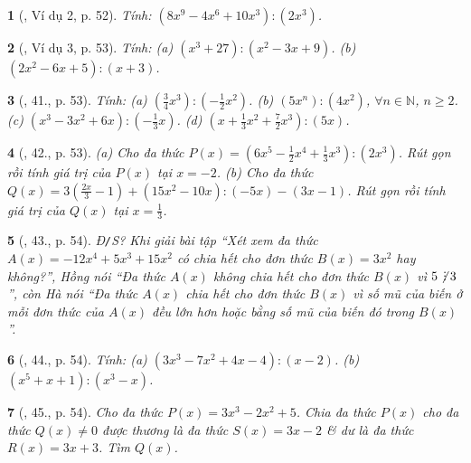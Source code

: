 \documentclass{article}
\newtheorem{baitoan}{}
\DeclareRobustCommand{\divby}{%
	\mathrel{\vbox{\baselineskip.65ex\lineskiplimit0pt\hbox{.}\hbox{.}\hbox{.}}}%
}
\begin{document}
\begin{baitoan}[\cite{SBT_Toan_7_Canh_Dieu_tap_2}, Ví dụ 2, p. 52]
	Tính: $(8x^9 - 4x^6 + 10x^3):(2x^3)$.
\end{baitoan}

\begin{baitoan}[\cite{SBT_Toan_7_Canh_Dieu_tap_2}, Ví dụ 3, p. 53]
	Tính: (a) $(x^3 + 27):(x^2 - 3x + 9)$. (b) $(2x^2 - 6x + 5):(x + 3)$.
\end{baitoan}

\begin{baitoan}[\cite{SBT_Toan_7_Canh_Dieu_tap_2}, 41., p. 53]
	Tính: (a) $\left(\frac{3}{4}x^3\right):\left(-\frac{1}{2}x^2\right)$. (b) $(5x^n):(4x^2)$, $\forall n\in\mathbb{N}$, $n\ge2$. (c) $(x^3 - 3x^2 + 6x):\left(-\frac{1}{3}x\right)$. (d) $\left(x + \frac{1}{3}x^2 + \frac{7}{2}x^3\right):(5x)$.
\end{baitoan}

\begin{baitoan}[\cite{SBT_Toan_7_Canh_Dieu_tap_2}, 42., p. 53]
	(a) Cho đa thức $P(x) = \left(6x^5 - \frac{1}{2}x^4 + \frac{1}{3}x^3\right):(2x^3)$. Rút gọn rồi tính giá trị của $P(x)$ tại $x = -2$. (b) Cho đa thức $Q(x) = 3\left(\frac{2x}{3} - 1\right) + (15x^2 - 10x):(-5x) - (3x - 1)$. Rút gọn rồi tính giá trị của $Q(x)$ tại $x = \frac{1}{3}$.
\end{baitoan}

\begin{baitoan}[\cite{SBT_Toan_7_Canh_Dieu_tap_2}, 43., p. 54]
	\emph{Đ\texttt{/}S?} Khi giải bài tập ``Xét xem đa thức $A(x) = -12x^4 + 5x^3 + 15x^2$ có chia hết cho đơn thức $B(x) = 3x^2$ hay không?'', Hồng nói ``Đa thức $A(x)$ không chia hết cho đơn thức $B(x)$ vì $5\not\,\divby3$'', còn Hà nói ``Đa thức $A(x)$ chia hết cho đơn thức $B(x)$ vì số mũ của biến ở mỗi đơn thức của $A(x)$ đều lớn hơn hoặc bằng số mũ của biến đó trong $B(x)$''.
\end{baitoan}

\begin{baitoan}[\cite{SBT_Toan_7_Canh_Dieu_tap_2}, 44., p. 54]
	Tính: (a) $(3x^3 - 7x^2 + 4x - 4):(x - 2)$. (b) $(x^5 + x + 1):(x^3 - x)$.
\end{baitoan}

\begin{baitoan}[\cite{SBT_Toan_7_Canh_Dieu_tap_2}, 45., p. 54]
	Cho đa thức $P(x) = 3x^3 - 2x^2 + 5$. Chia đa thức $P(x)$ cho đa thức $Q(x)\ne0$ được thương là đa thức $S(x) = 3x - 2$ \& dư là đa thức $R(x) = 3x + 3$. Tìm $Q(x)$.
\end{baitoan}
\end{document}
